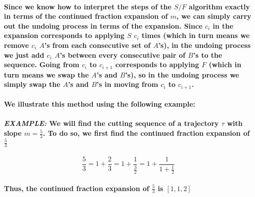 \documentclass{report}
\begin{document}
\paragraph{Since we know how to interpret the steps of the $S/F$ algorithm exactly in terms of the continued fraction expansion of $m$, we can simply carry out the undoing process in terms of the expansion. Since $c_i$ in the expansion corresponds to applying $S$ $c_i$ times (which in turn means we remove $c_i$ $A$’s from each consecutive set of $A$’s), in the undoing process we just add $c_i$ $A$’s between every consecutive pair of $B$’s to the sequence. Going from $c_i$ to $c_{i+1}$ corresponds to applying $F$ (which in turn means we swap the $A$’s and $B$’s), so in the undoing process we simply swap the $A$’s and $B$’s in moving from  $c_i$ to $c_{i+1}$.}

\paragraph{We illustrate this method using the following example:}


\paragraph{\textit{EXAMPLE:} We will find the cutting sequence of a trajectory $\tau$ with slope $m=\frac{5}{3}$. To do so, we first find the continued fraction expansion of $\frac{5}{3}$ }

\begin{equation}
\frac{5}{3}=1+\frac{2}{3}=1+\frac{1}{\frac{3}{2}}=1+\frac{1}{1+\frac{1}{2}}
\end{equation}

\paragraph{Thus, the continued fraction expansion of $\frac{5}{3}$ is $[1,1,2]$}
\end{document}
